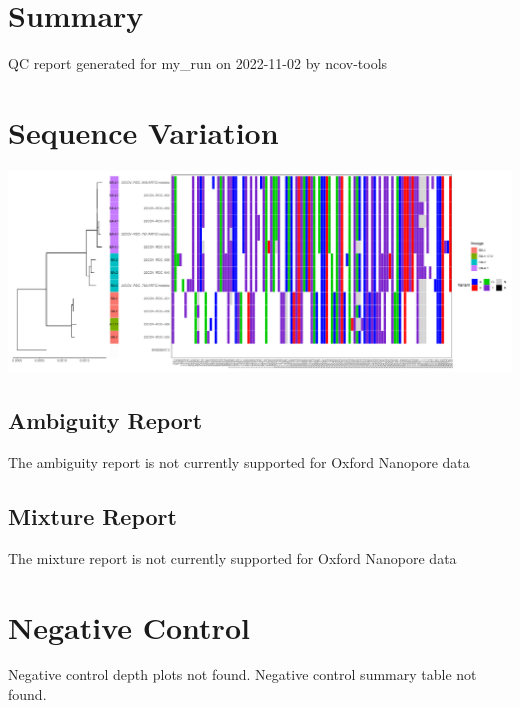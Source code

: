 \documentclass{article}
\begin{document}
\section{Summary}
QC report generated for my\_run on 2022-11-02 by ncov-tools
\section{Sequence Variation}
\begin{center}
\includegraphics[scale=0.400000]{plots/my_run_tree_snps.pdf}
\end{center}
\subsection{Ambiguity Report}
The ambiguity report is not currently supported for Oxford Nanopore data
\subsection{Mixture Report}
The mixture report is not currently supported for Oxford Nanopore data
\section{Negative Control}
Negative control depth plots not found.
Negative control summary table not found.
\end{document}
